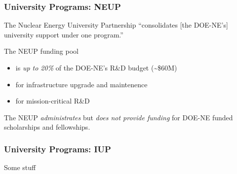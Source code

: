 \begin{frame}[ctb!]
  \frametitle{University Programs: NEUP}
  The Nuclear Energy University Partnership ``consolidates [the DOE-NE's] 
  university support under one program.''
  \vspace{0.4cm}
  \pause
  
  The NEUP funding pool
  \begin{itemize}
    \item is \emph{up to 20\%} of the DOE-NE's R\&D budget (\textasciitilde\$60M)
    \item for infrastructure upgrade and maintenence
    \item for mission-critical R\&D
  \end{itemize}
  \vspace{0.3cm}
  \pause
  
  The NEUP \emph{administrates} but \emph{does not provide funding} for
  DOE-NE funded scholarships and fellowships.
\end{frame}

\begin{frame}[ctb!]
  \frametitle{University Programs: IUP}
  Some stuff
\end{frame}
